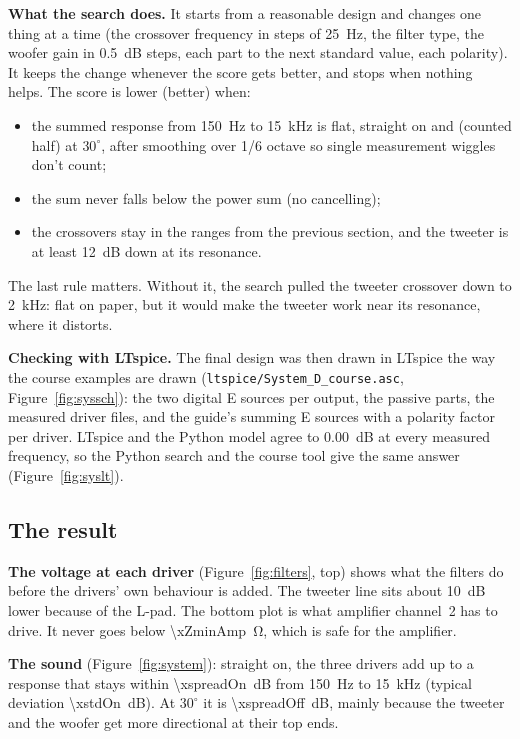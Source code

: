 \documentclass[a4paper,10pt]{article}
\newcommand{\file}[1]{\nolinkurl{#1}}
\begin{document}
\textbf{What the search does.} It starts from a reasonable design and changes one thing at a time
(the crossover frequency in steps of \SI{25}{Hz}, the filter type, the woofer gain in \SI{0.5}{dB}
steps, each part to the next standard value, each polarity). It keeps the change whenever the score
gets better, and stops when nothing helps. The score is lower (better) when:
\begin{itemize}
\item the summed response from \SI{150}{Hz} to \SI{15}{kHz} is flat, straight on and (counted half) at
  $30^\circ$, after smoothing over 1/6 octave so single measurement wiggles don't count;
\item the sum never falls below the power sum (no cancelling);
\item the crossovers stay in the ranges from the previous section, and the tweeter is at least
  \SI{12}{dB} down at its resonance.
\end{itemize}
The last rule matters. Without it, the search pulled the tweeter crossover down to \SI{2}{kHz}: flat
on paper, but it would make the tweeter work near its resonance, where it distorts.

\textbf{Checking with LTspice.} The final design was then drawn in LTspice the way the course
examples are drawn (\file{ltspice/System_D_course.asc}, Figure~\ref{fig:syssch}): the two digital E
sources per output, the passive parts, the measured driver files, and the guide's summing E sources
with a polarity factor per driver. LTspice and the Python model agree to \SI{0.00}{dB} at every measured
frequency, so the Python search and the course tool give the same answer (Figure~\ref{fig:syslt}).

\subsection{The result}
\textbf{The voltage at each driver} (Figure~\ref{fig:filters}, top) shows what the filters do before
the drivers' own behaviour is added. The tweeter line sits about \SI{10}{dB} lower because of the
L-pad. The bottom plot is what amplifier channel~2 has to drive. It never goes below
\SI{\xZminAmp}{\ohm}, which is safe for the amplifier.

\textbf{The sound} (Figure~\ref{fig:system}): straight on, the three drivers add up to a response that
stays within \SI{\xspreadOn}{dB} from \SI{150}{Hz} to \SI{15}{kHz} (typical deviation
\SI{\xstdOn}{dB}). At $30^\circ$ it is \SI{\xspreadOff}{dB}, mainly because the tweeter and the
woofer get more directional at their top ends.
\end{document}
